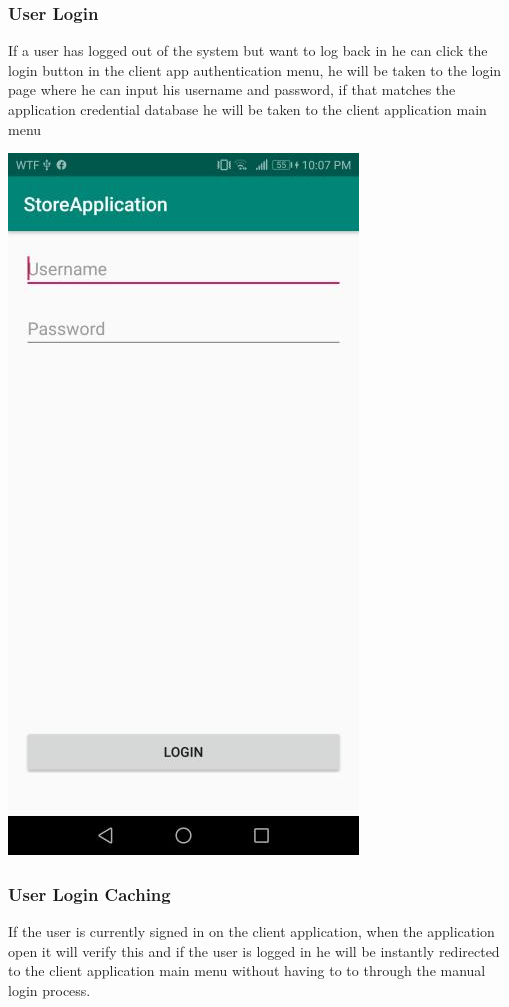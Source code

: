 \documentclass[12pt]{article}
\begin{document}
\subsubsection{User Login}
\hspace{0.6cm}
If a user has logged out of the system but want to log back in he can click the login button in the client app
authentication menu, he will be taken to the login page where he can input his username and password, if that
matches the application credential database he will be taken to the client application main menu

\begin{center}
\includegraphics[width=0.35\linewidth]{Images/Client/ClientLogin.jpg}
\end{center}

\subsubsection{User Login Caching}
\hspace{0.6cm}
If the user is currently signed in on the client application, when the application open it will verify this and
if the user is logged in he will be instantly redirected to the client application main menu without having to
to through the manual login process.
\end{document}
